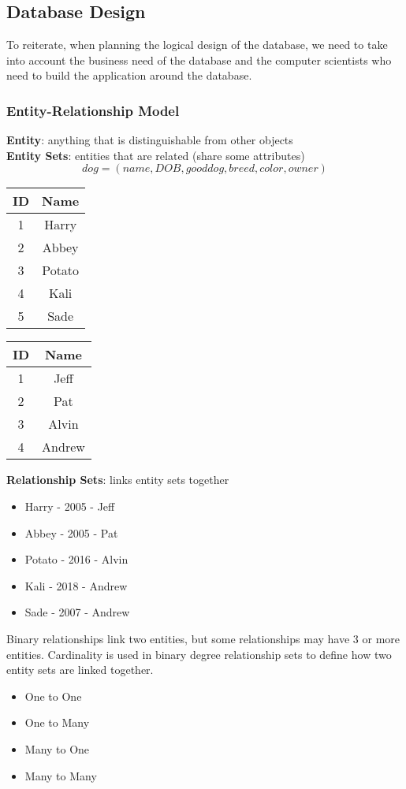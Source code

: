 \documentclass{math}
\begin{document}
\subsection*{Database Design}
To reiterate, when planning the logical design of the database, we need to take
into account the business need of the database and the computer scientists who
need to build the application around the database.

\subsubsection*{Entity-Relationship Model}
\textbf{Entity}: anything that is distinguishable from other objects \\
\textbf{Entity Sets}: entities that are related (share some attributes)
\[ dog = (name,DOB,gooddog,breed,color,owner) \]
\begin{center}
  \begin{tabular}{|c|c|}
    \hline
    ID & Name \\
    \hline
    1 & Harry \\
    2 & Abbey \\
    3 & Potato \\
    4 & Kali \\
    5 & Sade \\
    \hline
  \end{tabular}
  \begin{tabular}{|c|c|}
    \hline
    ID & Name \\
    \hline
    1 & Jeff \\
    2 & Pat \\
    3 & Alvin \\
    4 & Andrew \\
    \hline
  \end{tabular}
\end{center}
\textbf{Relationship Sets}: links entity sets together
\begin{itemize}
  \item Harry - 2005 - Jeff
  \item Abbey - 2005 - Pat
  \item Potato - 2016 - Alvin
  \item Kali - 2018 - Andrew
  \item Sade - 2007 - Andrew
\end{itemize}
Binary relationships link two entities, but some relationships may have 3 or
more entities. Cardinality is used in binary degree relationship sets to define
how two entity sets are linked together.
\begin{itemize}
  \item One to One
  \item One to Many
  \item Many to One
  \item Many to Many
\end{itemize}
\end{document}
